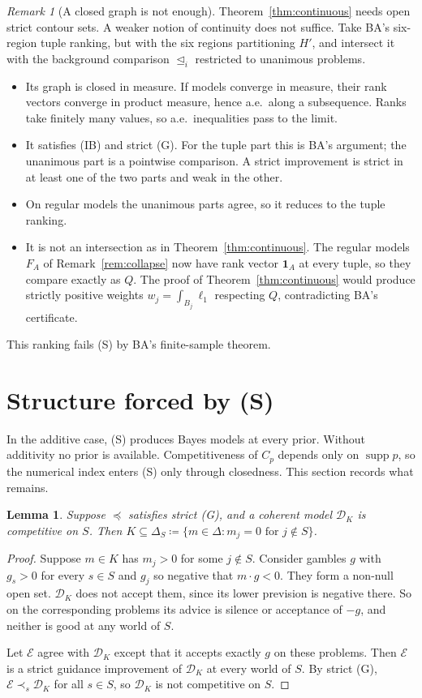 \documentclass[11pt]{article}
\newtheorem{lemma}[theorem]{Lemma}
\theoremstyle{remark}\newtheorem{remark}[theorem]{Remark}
\newcommand{\Dscr}{\mathcal D}
\newcommand{\Escr}{\mathcal E}
\newcommand{\supp}{\operatorname{supp}}
\newcommand{\one}{\mathbf 1}
\begin{document}
\begin{remark}[A closed graph is not enough]\label{rem:closed-graph}
Theorem~\ref{thm:continuous} needs open strict contour sets. A weaker notion
of continuity does not suffice. Take BA's six-region tuple ranking, but with
the six regions partitioning $H'$, and intersect it with the background
comparison $\unlhd_i$ restricted to unanimous problems.
\begin{itemize}[leftmargin=*,itemsep=2pt]
\item Its graph is closed in measure. If models converge in measure, their
rank vectors converge in product measure, hence a.e.\ along a subsequence.
Ranks take finitely many values, so a.e.\ inequalities pass to the limit.
\item It satisfies (IB) and strict (G). For the tuple part this is BA's
argument; the unanimous part is a pointwise comparison. A strict improvement
is strict in at least one of the two parts and weak in the other.
\item On regular models the unanimous parts agree, so it reduces to the tuple
ranking.
\item It is not an intersection as in Theorem~\ref{thm:continuous}. The regular
models $F_A$ of Remark~\ref{rem:collapse} now have rank vector $\one_A$ at
every tuple, so they compare exactly as $Q$. The proof of
Theorem~\ref{thm:continuous} would produce strictly positive weights
$w_j=\int_{B_j}\ell_1$ respecting $Q$, contradicting BA's certificate.
\end{itemize}
This ranking fails (S) by BA's finite-sample theorem.
\end{remark}

\section{Structure forced by (S)}\label{sec:structure}

In the additive case, (S) produces Bayes models at every prior. Without
additivity no prior is available. Competitiveness of $C_p$ depends only on
$\supp p$, so the numerical index enters (S) only through closedness. This
section records what remains.

\begin{lemma}\label{lem:face}
Suppose $\preceq$ satisfies strict (G), and a coherent model $\Dscr_K$ is
competitive on $S$. Then $K\subseteq\Delta_S\coloneqq\{m\in\Delta:m_j=0\text{ for }j\notin S\}$.
\end{lemma}
\begin{proof}
Suppose $m\in K$ has $m_j>0$ for some $j\notin S$. Consider gambles $g$ with
$g_s>0$ for every $s\in S$ and $g_j$ so negative that $m\cdot g<0$. They form a
non-null open set. $\Dscr_K$ does not accept them, since its lower prevision
is negative there. So on the corresponding problems its advice is silence or
acceptance of $-g$, and neither is good at any world of $S$.

Let $\Escr$ agree with $\Dscr_K$ except that it accepts exactly $g$ on these
problems. Then $\Escr$ is a strict guidance improvement of $\Dscr_K$ at every
world of $S$. By strict (G), $\Escr\prec_s\Dscr_K$ for all $s\in S$, so
$\Dscr_K$ is not competitive on $S$.
\end{proof}
\end{document}
